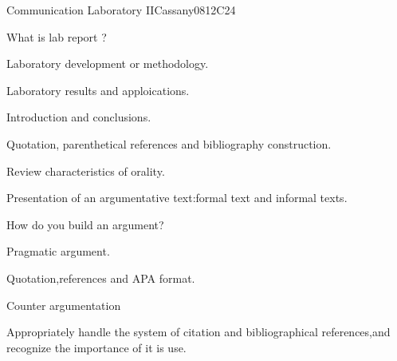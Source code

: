 \begin{syllabus}
\begin{competences}
    \item {}
\end{competences}

\begin{unit}{Communication Laboratory II}{}{Cassany08}{12}{C24}
   \begin{topics}
      \item What is lab report ?
      \item Laboratory development or methodology.
      \item Laboratory results and apploications.
      \item Introduction and conclusions.
      \item Quotation, parenthetical references and bibliography construction.
      \item Review characteristics of orality.
      \item Presentation of an argumentative text:formal text and informal texts.
      \item How do you build an argument?
      \item Pragmatic argument.
      \item Quotation,references and APA format.
      \item Counter argumentation 
      
   \end{topics}
   \begin{learningoutcomes}
      \item Appropriately handle the system of citation and bibliographical references,and recognize the importance of it is use.
   \end{learningoutcomes}
\end{unit}

\begin{coursebibliography}
\end{coursebibliography}

\end{syllabus}
